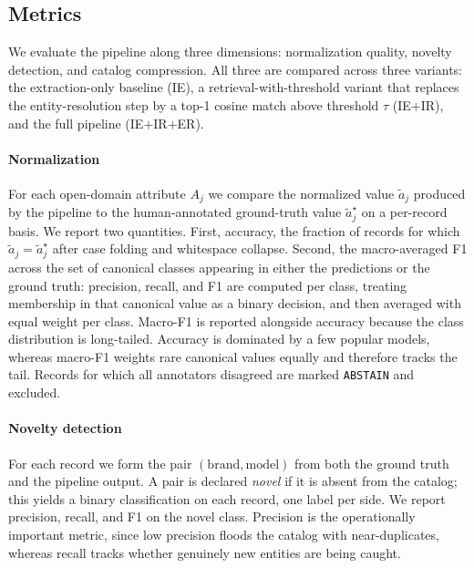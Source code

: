 \documentclass[conference]{IEEEtran}
\begin{document}
\subsection{Metrics}
\label{sec:metrics}

We evaluate the pipeline along three dimensions: normalization quality,
novelty detection, and catalog compression. All three are compared
across three variants: the extraction-only baseline (IE), a
retrieval-with-threshold variant that replaces the entity-resolution
step by a top-1 cosine match above threshold $\tau$ (IE$+$IR), and the
full pipeline (IE$+$IR$+$ER).

\paragraph{Normalization}
For each open-domain attribute $A_j$ we compare the normalized value $\tilde{a}_j$
produced by the pipeline to the human-annotated ground-truth value
$\tilde{a}_j^\star$ on a per-record basis. We report two quantities.
First, accuracy, the fraction of records for which $\tilde{a}_j
= \tilde{a}_j^\star$ after case folding and whitespace collapse.
Second, the macro-averaged F1 across the
set of canonical classes appearing in either the predictions or the
ground truth: precision, recall, and F1 are computed per class, treating
membership in that canonical value as a binary decision, and then
averaged with equal weight per class. Macro-F1 is reported alongside
accuracy because the class distribution is long-tailed. Accuracy is
dominated by a few popular models, whereas macro-F1 weights rare
canonical values equally and therefore tracks the tail. Records for
which all annotators disagreed are marked \texttt{ABSTAIN} and excluded.

\paragraph{Novelty detection}
For each record we form the pair $(\mathrm{brand}, \mathrm{model})$
from both the ground truth and the pipeline output. A pair is declared
\textit{novel} if it is absent from the catalog; this
yields a binary classification on each record, one label per side.
We report precision, recall, and F1 on the novel class.
Precision is the operationally important metric, since low precision
floods the catalog with near-duplicates, whereas recall tracks whether
genuinely new entities are being caught.
\end{document}
